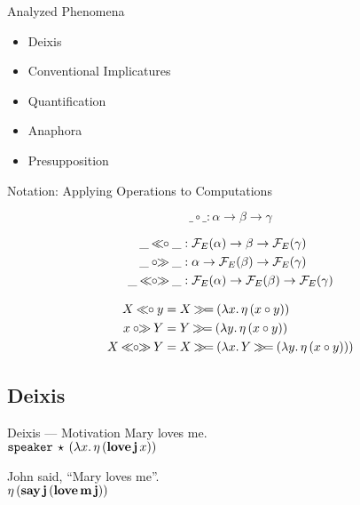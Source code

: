 \documentclass{beamer}
\begin{document}
\begin{frame}{Analyzed Phenomena}
  \begin{itemize}
  \item \alert<2>{Deixis}
  \item \alert<2>{Conventional Implicatures}
  \item \alert<2>{Quantification}
  \item Anaphora
  \item Presupposition
  \end{itemize}
\end{frame}


\begin{frame}{Notation: Applying Operations to Computations}

  $$
  \_ \circ \_ : \alpha \to \beta \to \gamma
  $$

  \pause
  
  \begin{align*}
  \_ \opl{\circ} \_ &: \FF_E(\alpha) \to \beta \to \FF_E(\gamma) \\
  \_ \opr{\circ} \_ &: \alpha \to \FF_E(\beta) \to \FF_E(\gamma) \\
  \_ \oplr{\circ} \_ &: \FF_E(\alpha) \to \FF_E(\beta) \to \FF_E(\gamma)
  \end{align*}

  \pause

  \begin{align*}
  X \opl{\circ} y &= X \hsbind (\lam{x}{\ap{\eta}{(x \circ y)}}) \\
  x \opr{\circ} Y &= Y \hsbind (\lam{y}{\ap{\eta}{(x \circ y)}}) \\
  X \oplr{\circ} Y &= X \hsbind (\lam{x}{Y \hsbind (\lam{y}{\ap{\eta}{(x \circ y)}})})
  \end{align*}
\end{frame}



\subsection{Deixis}


\begin{frame}{Deixis --- Motivation}
  Mary loves me. \\
  $\mathtt{speaker}\,\star\,(\lambda x.\, \eta\,(\textbf{love}\,\textbf{j}\,x))$

  \vfill
  
  John said, ``Mary loves me''. \\
  $\eta\,(\textbf{say}\,\textbf{j}\,(\textbf{love}\,\textbf{m}\,\textbf{j}))$
\end{frame}
\end{document}
